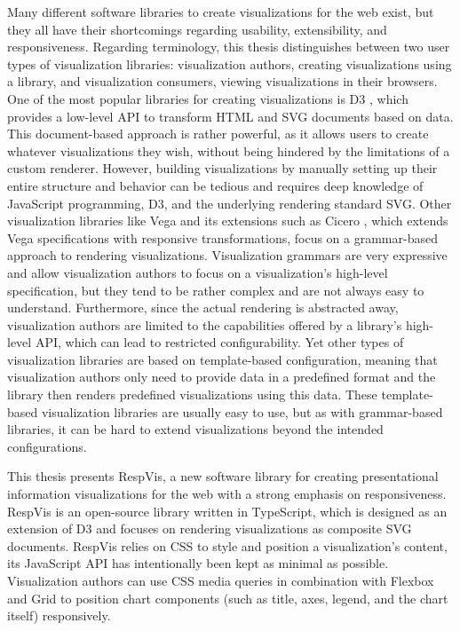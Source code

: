 Many different software libraries to create visualizations for the web
exist, but they all have their shortcomings regarding usability,
extensibility, and responsiveness. Regarding terminology, this thesis
distinguishes between two user types of visualization libraries:
visualization authors, creating visualizations using a library, and
visualization consumers, viewing visualizations in their browsers. One
of the most popular libraries for creating visualizations is D3
\parencite{D3,D3JS}, which provides a low-level API to transform HTML
and SVG documents based on data. This document-based approach is
rather powerful, as it allows users to create whatever visualizations
they wish, without being hindered by the limitations of a custom
renderer. However, building visualizations by manually setting up
their entire structure and behavior can be tedious and requires deep
knowledge of JavaScript programming, D3, and the underlying rendering
standard SVG.
%
Other visualization libraries like Vega \parencite{Vega} and its
extensions such as Cicero \parencite{Cicero}, which extends Vega
specifications with responsive transformations, focus on a
grammar-based approach to rendering visualizations. Visualization
grammars are very expressive and allow visualization authors to focus
on a visualization's high-level specification, but they tend to be
rather complex and are not always easy to understand. Furthermore,
since the actual rendering is abstracted away, visualization authors
are limited to the capabilities offered by a library's high-level API,
which can lead to restricted configurability.
%
Yet other types of visualization libraries are based on template-based
configuration, meaning that visualization authors only need to provide
data in a predefined format and the library then renders predefined
visualizations using this data. These template-based visualization
libraries are usually easy to use, but as with grammar-based
libraries, it can be hard to extend visualizations beyond the intended
configurations.


This thesis presents RespVis, a new software library for creating
presentational information visualizations for the web with a strong
emphasis on responsiveness. RespVis is an open-source library
\parencite{RespVisGitHub} written in TypeScript, which is designed as
an extension of D3 and focuses on rendering visualizations as
composite SVG documents. RespVis relies on CSS to style and position a
visualization's content, its JavaScript API has intentionally been
kept as minimal as possible. Visualization authors can use CSS media
queries in combination with Flexbox and Grid to position chart
components (such as title, axes, legend, and the chart itself)
responsively.

